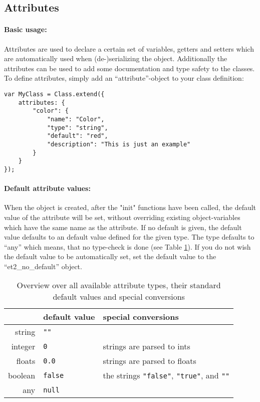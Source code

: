 \documentclass[10pt,a4paper]{report}
\begin{document}
\subsection*{Attributes}

\paragraph{Basic usage:}
Attributes are used to declare a certain set of variables, getters and setters which are automatically used when (de-)serializing the object. Additionally the attributes can be used to add some documentation and type safety to the classes. To define attributes, simply add an ``attribute''-object to your class definition:
\begin{verbatim}
var MyClass = Class.extend({
    attributes: {
        "color": {
            "name": "Color",
            "type": "string",
            "default": "red",
            "description": "This is just an example"
        }
    }
});
\end{verbatim}

\paragraph{Default attribute values:}
When the object is created, after the "init" functions have been called, the default value of the attribute will be set, without overriding existing object-variables which have the same name as the attribute. If no default is given, the default value defaults to an default value defined for the given type. The type defaults to ``any'' which means, that no type-check is done (see Table \ref{tbl:attr_types}). If you do not wish the default value to be automatically set, set the default value to the ``et2\_no\_default'' object.

\begin{table}
	\begin{center}
		\begin{tabular}{r | l l}
			 & \textbf{default value} & \textbf{special conversions} \\
			\hline
			string & \texttt{""} & \\
			integer & \texttt{0} & strings are parsed to ints \\
			floats & \texttt{0.0} & strings are parsed to floats \\
			boolean & \texttt{false} & the strings \texttt{"false"}, \texttt{"true"}, and \texttt{""} \\
			any & \texttt{null} & \\
		\end{tabular}
	\end{center}
	\label{tbl:attr_types}
	\caption{Overview over all available attribute types, their standard default values and special conversions}
\end{table}
\end{document}
